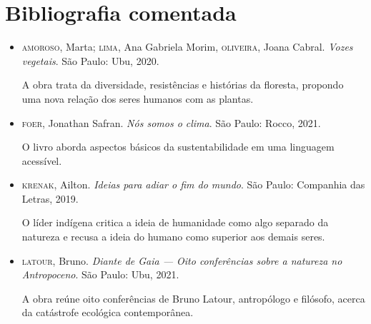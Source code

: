 \documentclass[11pt]{extarticle}
\begin{document}
\section{Bibliografia comentada}

\begin{itemize}

\item \textsc{amoroso}, Marta; \textsc{lima}, Ana Gabriela Morim, \textsc{oliveira}, Joana Cabral. \textit{Vozes vegetais}. São Paulo: Ubu, 2020.

A obra trata da diversidade, resistências e histórias da floresta, propondo uma nova relação dos seres humanos com as plantas.

\item \textsc{foer}, Jonathan Safran. \textit{Nós somos o clima}. São Paulo: Rocco, 2021.

O livro aborda aspectos básicos da sustentabilidade em uma linguagem acessível.

\item \textsc{krenak}, Ailton. \textit{Ideias para adiar o fim do mundo}. São Paulo:
Companhia das Letras, 2019.

O líder indígena critica a ideia de humanidade como algo separado da natureza e recusa a ideia do humano como superior aos demais seres.

\item \textsc{latour}, Bruno. \textit{Diante de Gaia --- Oito conferências sobre a natureza no Antropoceno}. São Paulo: Ubu, 2021.

A obra reúne oito conferências de Bruno Latour, antropólogo e filósofo, acerca da catástrofe ecológica contemporânea.

\end{itemize}
\end{document}
